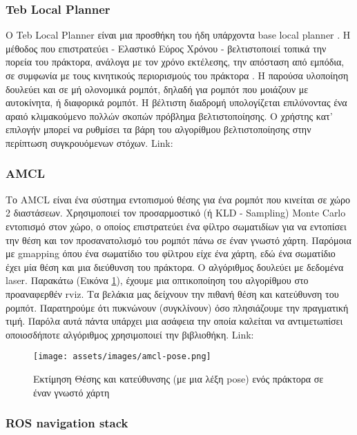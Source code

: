 \subsubsection{Teb Local Planner}

Ο Teb Local Planner είναι μια προσθήκη του ήδη υπάρχοντα base local planner \cite{Gerkey}.
Η μέθοδος που επιστρατεύει - Ελαστικό Εύρος Χρόνου - βελτιστοποιεί τοπικά την πορεία του πράκτορα, ανάλογα με τον χρόνο εκτέλεσης, την απόσταση από εμπόδια, σε συμφωνία με τους κινητικούς περιορισμούς του πράκτορα \cite{Christoph2015}. Η παρούσα υλοποίηση δουλεύει και σε μή ολονομικά ρομπότ, δηλαδή για ρομπότ που μοιάζουν με αυτοκίνητα, ή διαφορικά ρομπότ. Η βέλτιστη διαδρομή υπολογίζεται επιλύνοντας ένα αραιό κλιμακούμενο πολλών σκοπών πρόβλημα βελτιστοποίησης. Ο χρήστης κατ' επιλογήν μπορεί να ρυθμίσει τα βάρη του αλγορίθμου βελτιστοποίησης στην περίπτωση συγκρουόμενων στόχων.
Link: \href{http://wiki.ros.org/teb_local_planner}{\color{blue}{Teb Local Planner}}

\subsubsection{AMCL}

Το AMCL είναι ένα σύστημα εντοπισμού θέσης για ένα ρομπότ που κινείται σε χώρο 2 διαστάσεων. Χρησιμοποιεί τον προσαρμοστικό (ή KLD - Sampling) Monte Carlo εντοπισμό στον χώρο, ο οποίος επιστρατεύει ένα φίλτρο σωματιδίων για να εντοπίσει την θέση και τον προσανατολισμό του ρομπότ πάνω σε έναν γνωστό χάρτη. Παρόμοια με gmapping όπου ένα σωματίδιο του φίλτρου είχε ένα χάρτη, εδώ ένα σωματίδιο έχει μία θέση και μια διεύθυνση του πράκτορα. Ο αλγόριθμος δουλεύει με δεδομένα laser. 
Παρακάτω (Εικόνα \ref{fig:amcl fig}),	 έχουμε μια οπτικοποίηση του αλγορίθμου στο προαναφερθέν rviz. Τα βελάκια μας δείχνουν την πιθανή θέση και κατεύθυνση του ρομπότ. Παρατηρούμε ότι πυκνώνουν (συγκλίνουν) όσο πλησιάζουμε την πραγματική τιμή. Παρόλα αυτά πάντα υπάρχει μια ασάφεια την οποία καλείται να αντιμετωπίσει οποιοσδήποτε αλγόριθμος χρησιμοποιεί την βιβλιοθήκη. Link: \href{http://wiki.ros.org/amcl}{\color{blue}{AMCL}}

\begin{figure}[!ht]
	\centering
	\texttt{[image: assets/images/amcl-pose.png]}
	\caption{Εκτίμηση Θέσης και κατεύθυνσης (με μια λέξη pose) ενός πράκτορα σε έναν γνωστό χάρτη}
	\label{fig:amcl fig}
\end{figure}
 
\subsubsection{ROS navigation stack}

